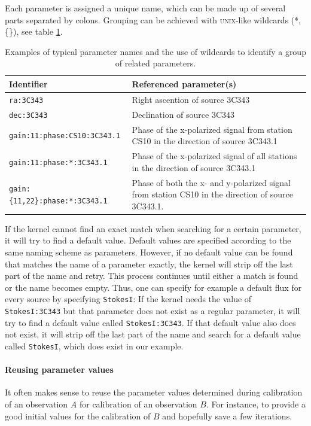 \documentclass[10pt]{lofar}
\begin{document}
Each parameter is assigned a unique name, which can be made up of several parts
separated by colons. Grouping can be achieved with \textsc{unix}-like wildcards
(*, \{\}), see table \ref{tab:naming_scheme}.
\begin{table}[htb!]
\centering
\begin{tabular}{lp{}}
\hline
\textbf{Identifier} & \textbf{Referenced parameter(s)} \\
\hline
\texttt{ra:3C343} & Right ascention of source 3C343 \\
\hline
\texttt{dec:3C343} & Declination of source 3C343 \\
\hline
\texttt{gain:11:phase:CS10:3C343.1} & Phase of the x-polarized signal from
station CS10 in the direction of source 3C343.1 \\
\hline
\texttt{gain:11:phase:*:3C343.1} & Phase of the x-polarized signal of all
stations in the direction of source 3C343.1 \\
\hline
\texttt{gain:\{11,22\}:phase:*:3C343.1} & Phase of both the x- and y-polarized
signal from station CS10 in the direction of source 3C343.1. \\
\hline
\end{tabular}
\caption{Examples of typical parameter names and the use of wildcards to
identify a group of related parameters.}
\label{tab:naming_scheme}
\end{table}
If the kernel cannot find an exact match when searching for a certain parameter,
it will try to find a default value. Default values are specified according to
the same naming scheme as parameters. However, if no default value can be found
that matches the name of a parameter exactly, the kernel will strip off the last
part of the name and retry. This process continues until either a match is found
or the name becomes empty. Thus, one can specify for example a default flux for
every source by specifying \texttt{StokesI}: If the kernel needs the value of
\texttt{StokesI:3C343} but that parameter does not exist as a regular parameter,
it will try to find a default value called \texttt{StokesI:3C343}. If that
default value also does not exist, it will strip off the last part of the name
and search for a default value called \texttt{StokesI}, which does exist in our
example.

\paragraph{Reusing parameter values}
It often makes sense to reuse the parameter values determined during
calibration of an observation $A$ for calibration of an observation $B$. For
instance, to provide a good initial values for the calibration of $B$ and
hopefully save a few iterations.
\end{document}
